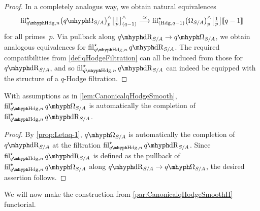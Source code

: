 \documentclass[DIV=12,numbers=enddot,leqno,bibliography=totoc]{scrartcl}
\begin{document}
\begin{proof}
		In a completely analogus way, we obtain natural equivalences
		\begin{equation*}
			\fil_{\qHodge,n}^\star\bigl(\qOmega_{S/A}\bigr)_p^\complete\bigl[\localise{p}\bigr]_{(q-1)}^\complete\overset{\simeq}{\longrightarrow}\fil_{(\Hodge,q-1)}^\star\bigl(\Omega_{S/A}\bigr)_p^\complete\bigl[\localise{p}\bigr]\qpower
		\end{equation*}
		for all primes~$p$. Via pullback along $\qdeRham_{S/A}\rightarrow\qOmega_{S/A}$, we obtain analogous equivalences for $\fil_{\qHodge,n}^\star \qdeRham_{S/A}$. The required compatibilities from \cref{def:qHodgeFiltration} can all be induced from those for $\qdeRham_{S/A}$, and so $\fil_{\qHodge,n}^\star\qdeRham_{S/A}$ can indeed be equipped with the structure of a $q$-Hodge filtration.
	\end{proof}
	\begin{lem}
		With assumptions as in \cref{lem:CanonicalqHodgeSmooth}, $\fil_{\qHodge,n}^\star\qOmega_{S/A}$ is automatically the completion of $\fil_{\qHodge,n}^\star\qdeRham_{S/A}$.
	\end{lem}
	
	\begin{proof}
		By \cref{prop:Letaq-1}, $\qOmega_{S/A}$ is automatically the completion of $\qdeRham_{S/A}$ at the filtration $\fil_{\qHodge,n}^\star\qdeRham_{S/A}$. Since $\fil_{\qHodge,n}^\star\qdeRham_{S/A}$ is defined as the pullback of $\fil_{\qHodge,n}^\star\qOmega_{S/A}$ along $\qdeRham_{S/A}\rightarrow \qOmega_{S/A}$, the desired assertion follows.
	\end{proof}
	
	We will now make the construction from \cref{par:CanonicalqHodgeSmoothII} functorial.
	
\end{document}
